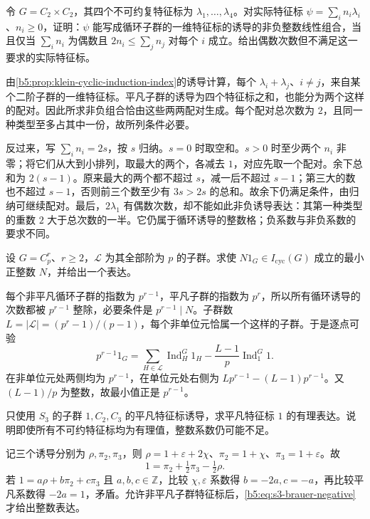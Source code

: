 \begin{exercise}\label{b5:ex:05-klein-exact-index}
	令 \(G=C_2\times C_2\)，其四个不可约复特征标为 \(\lambda_1,\ldots,\lambda_4\)。对实际特征标 \(\psi=\sum_i n_i\lambda_i\)、\(n_i\ge0\)，证明：\(\psi\) 能写成循环子群的一维特征标的诱导的非负整数线性组合，当且仅当 \(\sum_i n_i\) 为偶数且 \(2n_i\le\sum_j n_j\) 对每个 \(i\) 成立。给出偶数次数但不满足这一要求的实际特征标。
\end{exercise}
\begin{solution}
	由\cref{b5:prop:klein-cyclic-induction-index}的诱导计算，每个 \(\lambda_i+\lambda_j\)、\(i\ne j\)，来自某个二阶子群的一维特征标。平凡子群的诱导为四个特征标之和，也能分为两个这样的配对。因此所求非负组合恰由这些两两配对生成。每个配对总次数为 \(2\)，且同一种类型至多占其中一份，故所列条件必要。

	反过来，写 \(\sum_i n_i=2s\)，按 \(s\) 归纳。\(s=0\) 时取空和。\(s>0\) 时至少两个 \(n_i\) 非零；将它们从大到小排列，取最大的两个，各减去 \(1\)，对应先取一个配对。余下总和为 \(2(s-1)\)。原来最大的两个都不超过 \(s\)，减一后不超过 \(s-1\)；第三大的数也不超过 \(s-1\)，否则前三个数至少有 \(3s>2s\) 的总和。故余下仍满足条件，由归纳可继续配对。最后，\(2\lambda_1\) 有偶数次数，却不能如此非负诱导表达：其第一种类型的重数 \(2\) 大于总次数的一半。它仍属于循环诱导的整数格；负系数与非负系数的要求不同。
\end{solution}

\begin{exercise}\label{b5:ex:05-elementary-abelian-denominator}
	设 \(G=C_p^r\)、\(r\ge2\)，\(\mathcal L\) 为其全部阶为 \(p\) 的子群。求使 \(N1_G\in I_{\mathrm{cyc}}(G)\) 成立的最小正整数 \(N\)，并给出一个表达。
\end{exercise}
\begin{solution}
	每个非平凡循环子群的指数为 \(p^{r-1}\)，平凡子群的指数为 \(p^r\)，所以所有循环诱导的次数都被 \(p^{r-1}\) 整除，必要条件是 \(p^{r-1}\mid N\)。子群数 \(L=|\mathcal L|=(p^r-1)/(p-1)\)，每个非单位元恰属一个这样的子群。于是逐点可验
	\[
		p^{r-1}1_G =\sum_{H\in\mathcal L}\operatorname{Ind}_H^G1_H -\frac{L-1}{p}\operatorname{Ind}_1^G1.
	\]
	在非单位元处两侧均为 \(p^{r-1}\)，在单位元处右侧为 \(Lp^{r-1}-(L-1)p^{r-1}\)。又 \((L-1)/p\) 为整数，故最小值正是 \(p^{r-1}\)。
\end{solution}

\begin{exercise}\label{b5:ex:05-permutation-artin-s3}
	只使用 \(S_3\) 的子群 \(1,C_2,C_3\) 的平凡特征标诱导，求平凡特征标 \(1\) 的有理表达。说明即使所有不可约特征标均为有理值，整数系数仍可能不足。
\end{exercise}
\begin{solution}
	记三个诱导分别为 \(\rho,\pi_2,\pi_3\)，则 \(\rho=1+\varepsilon+2\chi\)、\(\pi_2=1+\chi\)、\(\pi_3=1+\varepsilon\)。故
	\[
		1=\pi_2+\tfrac12\pi_3-\tfrac12\rho.
	\]
	若 \(1=a\rho+b\pi_2+c\pi_3\) 且 \(a,b,c\in\mathbb Z\)，比较 \(\chi,\varepsilon\) 系数得 \(b=-2a,c=-a\)，再比较平凡系数得 \(-2a=1\)，矛盾。允许非平凡子群特征标后，\eqref{b5:eq:s3-brauer-negative}才给出整数表达。
\end{solution}

